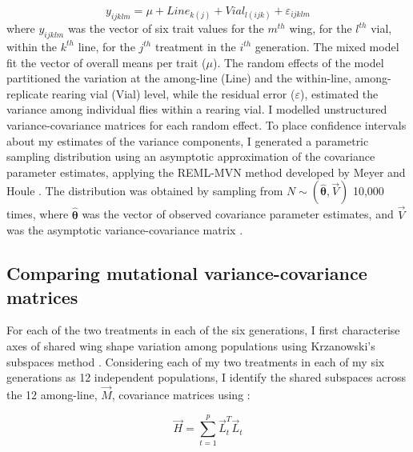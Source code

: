 \vspace{-\parskip}
\begin{equation}
y_{ijklm} = \mu + Line_{k(j)} + Vial_{l(ijk)}+ \varepsilon_{ijklm} \label{eqn:multi_1}
\end{equation}
\noindent where $y_{ijklm}$ was the vector of six trait values for the $m^{th}$ wing, for the $l^{th}$ vial, within the $k^{th}$ line, for the $j^{th}$ treatment in the $i^{th}$ generation. The mixed model fit the vector of overall means per trait ($\mu$). The random effects of the model partitioned the variation at the among-line (Line) and the within-line, among-replicate rearing vial (Vial) level, while the residual error ($\varepsilon$), estimated the variance among individual flies within a rearing vial. I modelled unstructured variance-covariance matrices for each random effect. To place confidence intervals about my estimates of the variance components, I generated a parametric sampling distribution using an asymptotic approximation of the covariance parameter estimates, applying the REML-MVN method developed by Meyer and Houle \citeyear{Houl15,Meye13}. The distribution was obtained by sampling from $N\sim(\boldsymbol{\hat{\theta}}, \vec{V})$ 10,000 times, where $\boldsymbol{\hat{\theta}}$ was the vector of observed covariance parameter estimates, and $\vec{V}$ was the asymptotic variance-covariance matrix \citep{Houl15,Meye13,Szte17a}. \par

\subsection{Comparing mutational variance-covariance matrices}

For each of the two treatments in each of the six generations, I first characterise axes of shared wing shape variation among populations using Krzanowski’s subspaces method \citep{Krza79, Agui14}. Considering each of my two treatments in each of my six generations as 12 independent populations, I identify the shared subspaces across the 12 among-line,  $\vec{M}$, covariance matrices using \citep{Krza79}:\par

\vspace{-\parskip}
\begin{equation}
\vec{H} = \sum_{t=1}^{p} \vec{L}_t^{T}\vec{L}_t \label{eqn:multi_2_H}
\end{equation}

